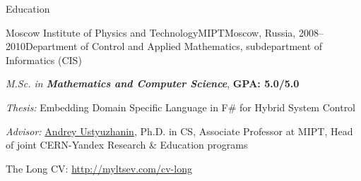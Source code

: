 \documentclass{resume} %
\newif\iflongversion
\begin{document}
\begin{rSection}{Education}

\begin{rSubsectionEducation}{Moscow Institute of Physics and Technology}{MIPT}{Moscow,
Russia, 2008--2010}{Department of Control and Applied Mathematics, 
subdepartment of Informatics (CIS)}
\item \textit{M.Sc. in \textbf{Mathematics and Computer Science}}, \textbf{GPA: 5.0/5.0}
\item \textit{Thesis:} Embedding Domain Specific Language in F\# for Hybrid System Control
\item \textit{Advisor:} \href{https://ru.linkedin.com/in/andreyustyuzhanin}{Andrey Ustyuzhanin},
Ph.D. in CS, Associate Professor at MIPT, Head of joint CERN-Yandex Research \& Education programs
\end{rSubsectionEducation}

\iflongversion
\else
The Long CV: {\href{http://myltsev.com/cv-long}{http://myltsev.com/cv-long}}

\end{rSection}
\fi
\end{document}
